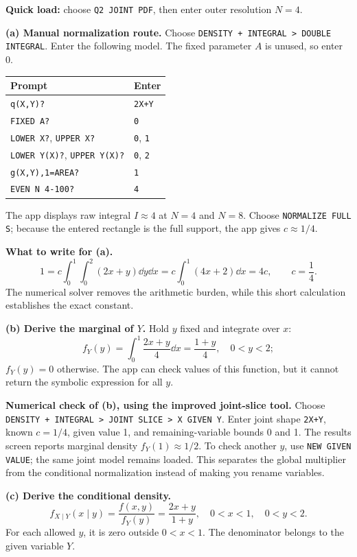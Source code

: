 \textbf{Quick load:} choose \texttt{Q2 JOINT PDF}, then enter outer resolution $N=4$.\par
\textbf{(a) Manual normalization route.} Choose \texttt{DENSITY + INTEGRAL > DOUBLE INTEGRAL}. Enter the following model. The fixed parameter $A$ is unused, so enter 0.
\begin{center}
\begin{tabular}{@{}ll@{}}
\toprule Prompt & Enter\\\midrule
\texttt{q(X,Y)?} & \texttt{2X+Y}\\
\texttt{FIXED A?} & \texttt{0}\\
\texttt{LOWER X?}, \texttt{UPPER X?} & \texttt{0}, \texttt{1}\\
\texttt{LOWER Y(X)?}, \texttt{UPPER Y(X)?} & \texttt{0}, \texttt{2}\\
\texttt{g(X,Y),1=AREA?} & \texttt{1}\\
\texttt{EVEN N 4-100?} & \texttt{4}\\\bottomrule
\end{tabular}
\end{center}
The app displays raw integral $I\approx4$ at $N=4$ and $N=8$. Choose \texttt{NORMALIZE FULL S}; because the entered rectangle is the full support, the app gives $c\approx1/4$.

\textbf{What to write for (a).}
\[
1=c\int_0^1\int_0^2(2x+y)\dd y\dd x
=c\int_0^1(4x+2)\dd x=4c,
\qquad \boxed{c=\frac14}.
\]
The numerical solver removes the arithmetic burden, while this short calculation establishes the exact constant.

\textbf{(b) Derive the marginal of $Y$.} Hold $y$ fixed and integrate over $x$:
\[
\boxed{f_Y(y)=\int_0^1\frac{2x+y}{4}\dd x=\frac{1+y}{4},\quad0<y<2;}
\]
$f_Y(y)=0$ otherwise. The app can check values of this function, but it cannot return the symbolic expression for all $y$.

\textbf{Numerical check of (b), using the improved joint-slice tool.} Choose \texttt{DENSITY + INTEGRAL > JOINT SLICE > X GIVEN Y}. Enter joint shape \texttt{2X+Y}, known $c=1/4$, given value 1, and remaining-variable bounds 0 and 1. The results screen reports marginal density $f_Y(1)\approx1/2$. To check another $y$, use \texttt{NEW GIVEN VALUE}; the same joint model remains loaded. This separates the global multiplier from the conditional normalization instead of making you rename variables.

\textbf{(c) Derive the conditional density.}
\[
\boxed{f_{X\mid Y}(x\mid y)=\frac{f(x,y)}{f_Y(y)}
=\frac{2x+y}{1+y},\quad0<x<1,\quad0<y<2.}
\]
For each allowed $y$, it is zero outside $0<x<1$. The denominator belongs to the given variable $Y$.

